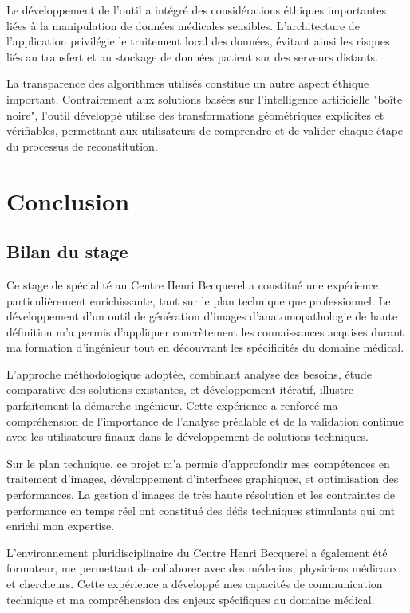 \documentclass[12pt,a4paper]{report}
\let\oldchapter\chapter
\renewcommand{\chapter}{\clearpage\oldchapter}
\begin{document}
Le développement de l'outil a intégré des considérations éthiques importantes liées à la manipulation de données médicales sensibles. L'architecture de l'application privilégie le traitement local des données, évitant ainsi les risques liés au transfert et au stockage de données patient sur des serveurs distants.

La transparence des algorithmes utilisés constitue un autre aspect éthique important. Contrairement aux solutions basées sur l'intelligence artificielle "boîte noire", l'outil développé utilise des transformations géométriques explicites et vérifiables, permettant aux utilisateurs de comprendre et de valider chaque étape du processus de reconstitution.

\chapter{Conclusion}

\clearpage

\section{Bilan du stage}

Ce stage de spécialité au Centre Henri Becquerel a constitué une expérience particulièrement enrichissante, tant sur le plan technique que professionnel. Le développement d'un outil de génération d'images d'anatomopathologie de haute définition m'a permis d'appliquer concrètement les connaissances acquises durant ma formation d'ingénieur tout en découvrant les spécificités du domaine médical.

L'approche méthodologique adoptée, combinant analyse des besoins, étude comparative des solutions existantes, et développement itératif, illustre parfaitement la démarche ingénieur. Cette expérience a renforcé ma compréhension de l'importance de l'analyse préalable et de la validation continue avec les utilisateurs finaux dans le développement de solutions techniques.

Sur le plan technique, ce projet m'a permis d'approfondir mes compétences en traitement d'images, développement d'interfaces graphiques, et optimisation des performances. La gestion d'images de très haute résolution et les contraintes de performance en temps réel ont constitué des défis techniques stimulants qui ont enrichi mon expertise.

L'environnement pluridisciplinaire du Centre Henri Becquerel a également été formateur, me permettant de collaborer avec des médecins, physiciens médicaux, et chercheurs. Cette expérience a développé mes capacités de communication technique et ma compréhension des enjeux spécifiques au domaine médical.
\end{document}
